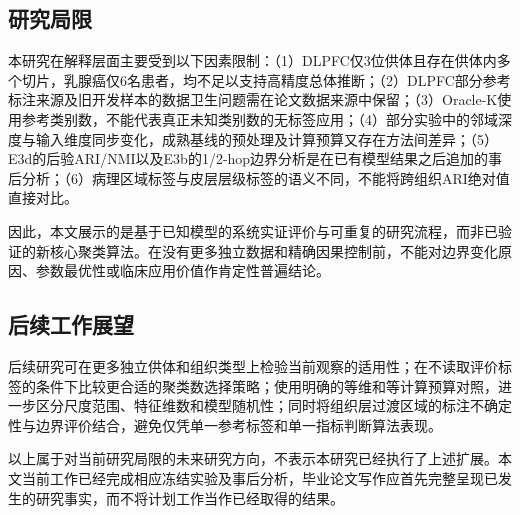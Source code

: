 \subsection{研究局限}
本研究在解释层面主要受到以下因素限制：（1）DLPFC仅3位供体且存在供体内多个切片，乳腺癌仅6名患者，均不足以支持高精度总体推断；（2）DLPFC部分参考标注来源及旧开发样本的数据卫生问题需在论文数据来源中保留；（3）Oracle-K使用参考类别数，不能代表真正未知类别数的无标签应用；（4）部分实验中的邻域深度与输入维度同步变化，成熟基线的预处理及计算预算又存在方法间差异；（5）E3d的后验ARI/NMI以及E3b的1/2-hop边界分析是在已有模型结果之后追加的事后分析；（6）病理区域标签与皮层层级标签的语义不同，不能将跨组织ARI绝对值直接对比。

因此，本文展示的是基于已知模型的系统实证评价与可重复的研究流程，而非已验证的新核心聚类算法。在没有更多独立数据和精确因果控制前，不能对边界变化原因、参数最优性或临床应用价值作肯定性普遍结论。

\subsection{后续工作展望}
后续研究可在更多独立供体和组织类型上检验当前观察的适用性；在不读取评价标签的条件下比较更合适的聚类数选择策略；使用明确的等维和等计算预算对照，进一步区分尺度范围、特征维数和模型随机性；同时将组织层过渡区域的标注不确定性与边界评价结合，避免仅凭单一参考标签和单一指标判断算法表现。

以上属于对当前研究局限的未来研究方向，不表示本研究已经执行了上述扩展。本文当前工作已经完成相应冻结实验及事后分析，毕业论文写作应首先完整呈现已发生的研究事实，而不将计划工作当作已经取得的结果。
